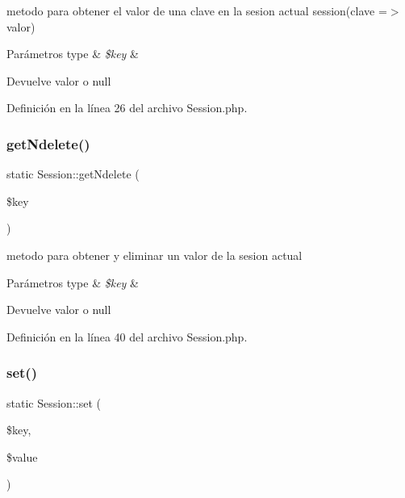 metodo para obtener el valor de una clave en la sesion actual session(clave =$>$ valor)


\begin{DoxyParams}[1]{Parámetros}
type & {\em \$key} & \\
\hline
\end{DoxyParams}
\begin{DoxyReturn}{Devuelve}
valor o null 
\end{DoxyReturn}


Definición en la línea 26 del archivo Session.\+php.

\mbox{\label{class_session_a894fdbe24e887cc604178f0234355440}} 
\subsubsection{\texorpdfstring{getNdelete()}{getNdelete()}}
{\footnotesize\ttfamily static Session\+::get\+Ndelete (\begin{DoxyParamCaption}\item[{}]{\$key }\end{DoxyParamCaption})\hspace{0.3cm}{\ttfamily [static]}}

metodo para obtener y eliminar un valor de la sesion actual


\begin{DoxyParams}[1]{Parámetros}
type & {\em \$key} & \\
\hline
\end{DoxyParams}
\begin{DoxyReturn}{Devuelve}
valor o null 
\end{DoxyReturn}


Definición en la línea 40 del archivo Session.\+php.

\mbox{\label{class_session_a5c3bf67e192c10d185e759567df6782a}} 
\subsubsection{\texorpdfstring{set()}{set()}}
{\footnotesize\ttfamily static Session\+::set (\begin{DoxyParamCaption}\item[{}]{\$key,  }\item[{}]{\$value }\end{DoxyParamCaption})\hspace{0.3cm}{\ttfamily [static]}}

